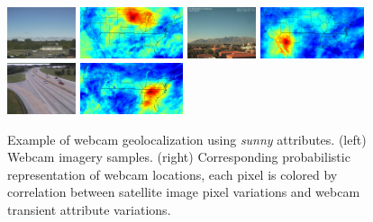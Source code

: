 \documentclass[10pt,twocolumn,letterpaper]{article}
\begin{document}
\begin{figure}
	\centering
		\includegraphics[width=0.18\textwidth]{figs/geoloc/297}
		\includegraphics[width=0.27\textwidth]{figs/geoloc/geoloc_8_297}
		\includegraphics[width=0.18\textwidth]{figs/geoloc/5207}
		\includegraphics[width=0.27\textwidth]{figs/geoloc/geoloc_24_5207}
		\includegraphics[width=0.18\textwidth]{figs/geoloc/23573}
		\includegraphics[width=0.27\textwidth]{figs/geoloc/geoloc_152_23573}
		\caption{Example of webcam geolocalization using
          \textit{sunny} attributes. (left) Webcam imagery
          samples. (right) Corresponding probabilistic representation
          of webcam locations, each pixel is colored by correlation
          between satellite image pixel variations and webcam
          transient attribute variations.}
		\label{fig:geoloc}
\end{figure}
\end{document}
